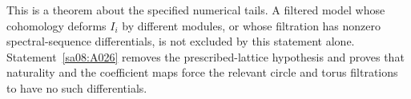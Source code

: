 This is a theorem about the specified numerical tails. A filtered
model whose cohomology deforms $I_i$ by different modules, or whose
filtration has nonzero spectral-sequence differentials, is not
excluded by this statement alone. Statement~\ref{sa08:A026}
removes the prescribed-lattice hypothesis and proves that naturality
and the coefficient maps force the relevant circle and torus
filtrations to have no such differentials.
